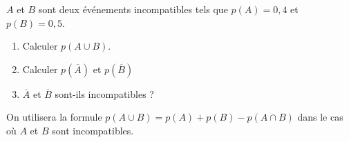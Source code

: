 
$A$ et $B$ sont deux événements incompatibles tels que $p(A)=0,4$ et $p(B)=0,5$.

\begin{enumerate}
\item Calculer $p(A \cup B)$.
\item Calculer $p(\overline{A})$ et $p(\overline{B})$
\item $\overline{A}$ et $\overline{B}$ sont-ils incompatibles ?
\end{enumerate}

On utilisera la formule $p(A\cup B)= p(A) + p(B) - p(A \cap B)$ dans le cas où $A$ et $B$ sont incompatibles.